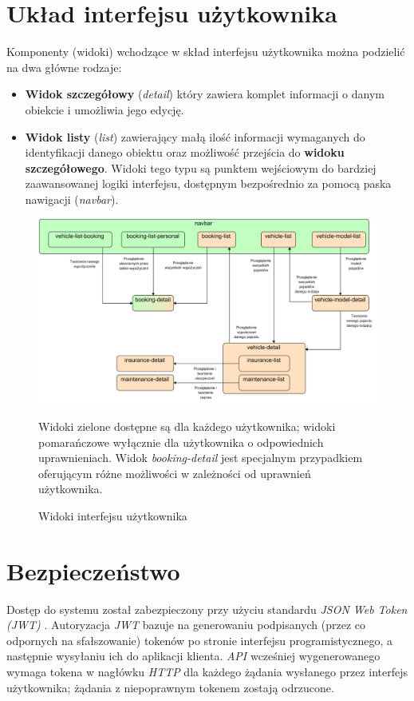 \documentclass[eng,printmode,openany]{mgr}
\begin{document}
\section{Układ interfejsu użytkownika}
Komponenty (widoki) wchodzące w skład interfejsu użytkownika można podzielić na dwa główne rodzaje:
\begin{itemize}
	\item \textbf{Widok szczegółowy} (\textit{detail}) który zawiera komplet informacji o danym obiekcie i umożliwia jego edycję.
	\item \textbf{Widok listy} (\textit{list}) zawierający małą ilość informacji wymaganych do identyfikacji danego obiektu oraz możliwość przejścia do \textbf{widoku szczegółowego}. Widoki tego typu są punktem wejściowym do bardziej zaawansowanej logiki interfejsu, dostępnym bezpośrednio za pomocą paska nawigacji (\textit{navbar}).
\end{itemize}
\begin{figure}[h]
	\centering
	\includegraphics[scale=0.62]{images/angular_views.png}
	\caption{Widoki interfejsu użytkownika}
	\small 
	Widoki zielone dostępne są dla każdego użytkownika; widoki pomarańczowe wyłącznie dla użytkownika o odpowiednich uprawnieniach. Widok \textit{booking-detail} jest specjalnym przypadkiem oferującym różne możliwości w zależności od uprawnień użytkownika.
\end{figure}

\section{Bezpieczeństwo}
Dostęp do systemu został zabezpieczony przy użyciu standardu \textit{JSON Web Token (JWT)} \cite{jwt}. Autoryzacja \textit{JWT} bazuje na generowaniu podpisanych (przez co odpornych na sfałszowanie) tokenów po stronie interfejsu programistycznego, a następnie wysyłaniu ich do aplikacji klienta. \textit{API} wcześniej wygenerowanego wymaga tokena w nagłówku \textit{HTTP} dla każdego żądania wysłanego przez interfejs użytkownika; żądania z niepoprawnym tokenem zostają odrzucone.
\end{document}

